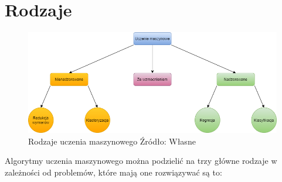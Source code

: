 \section{Rodzaje}
\begin{figure}[h!]
    \centering
    \includegraphics[width=1\textwidth]{./Img/typesofLearning.png}
    \caption{Rodzaje uczenia maszynowego Źródło: Własne}
\end{figure}
Algorytmy uczenia maszynowego można podzielić na trzy główne rodzaje w zależności od problemów, które mają one rozwiązywać są to:
